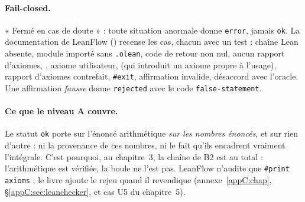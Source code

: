\paragraph{Fail-closed.} « Fermé en cas de doute » : toute situation anormale donne \texttt{error}, jamais
\texttt{ok}. La documentation de LeanFlow () recense les cas, chacun avec un test : chaîne
Lean absente, module importé sans \texttt{.olean}, code de retour non nul, aucun rapport d'axiomes, ,
axiome utilisateur,  (qui introduit un axiome propre à l'usage), rapport d'axiomes contrefait,
\texttt{\#exit}, affirmation invalide, désaccord avec l'oracle. Une affirmation \emph{fausse} donne \texttt{rejected} avec
le code \texttt{false-statement}.

\paragraph{Ce que le niveau A couvre.} Le statut \texttt{ok} porte sur l'énoncé arithmétique \emph{sur les nombres
énoncés}, et sur rien d'autre : ni la provenance de ces nombres, ni le fait qu'ils encadrent vraiment l'intégrale. C'est
pourquoi, au chapitre~3, la chaîne de B2 est \tierC{} au total : l'arithmétique est vérifiée, la boule ne l'est pas.
LeanFlow n'audite que \texttt{\#print axioms} ; le livre ajoute le rejeu  quand il revendique \tierA{}
(annexe~\ref{appC:chap}, §\ref{appC:sec:leanchecker}, et cas U5 du chapitre~5).

